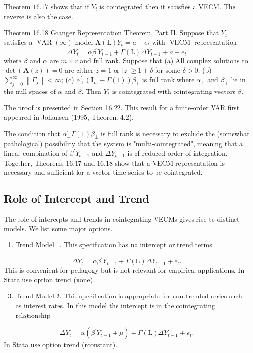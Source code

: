 \documentclass[10pt]{article}
\begin{document}
Theorem $16.17$ shows that if $Y_{t}$ is cointegrated then it satisfies a VECM. The reverse is also the case.

Theorem 16.18 Granger Representation Theorem, Part II. Suppose that $Y_{t}$ satisfies a $\operatorname{VAR}(\infty)$ model $\boldsymbol{A}(\mathrm{L}) Y_{t}=a+e_{t}$ with $\operatorname{VECM}$ representation
$$
\Delta Y_{t}=\alpha \beta^{\prime} Y_{t-1}+\Gamma(\mathrm{L}) \Delta Y_{t-1}+a+e_{t}
$$
where $\beta$ and $\alpha$ are $m \times r$ and full rank. Suppose that (a) All complex solutions to $\operatorname{det}(\boldsymbol{A}(z))=0$ are either $z=1$ or $|z| \geq 1+\delta$ for some $\delta>0$; (b) $\sum_{j=0}^{\infty}\left\|\Gamma_{j}\right\|<\infty$; (c) $\alpha_{\perp}^{\prime}\left(\boldsymbol{I}_{m}-\Gamma(1)\right) \beta_{\perp}$ is full rank where $\alpha_{\perp}$ and $\beta_{\perp}$ lie in the null spaces of $\alpha$ and $\beta$. Then $Y_{t}$ is cointegrated with cointegrating vectors $\beta$.

The proof is presented in Section 16.22. This result for a finite-order VAR first appeared in Johansen (1995, Theorem 4.2).

The condition that $\alpha_{\perp}^{\prime} \Gamma(1) \beta_{\perp}$ is full rank is necessary to exclude the (somewhat pathological) possibility that the system is "multi-cointegrated", meaning that a linear combination of $\beta^{\prime} Y_{t-1}$ and $\Delta Y_{t-1}$ is of reduced order of integration. Together, Theorems $16.17$ and $16.18$ show that a VECM representation is necessary and sufficient for a vector time series to be cointegrated.

\subsection{Role of Intercept and Trend}
The role of intercepts and trends in cointegrating VECMs gives rise to distinct models. We list some major options.

\begin{enumerate}
  \item Trend Model 1. This specification has no intercept or trend terms
\end{enumerate}
$$
\Delta Y_{t}=\alpha \beta^{\prime} Y_{t-1}+\Gamma(\mathrm{L}) \Delta Y_{t-1}+e_{t} .
$$
This is convenient for pedagogy but is not relevant for empirical applications. In Stata use option trend (none).

\begin{enumerate}
  \setcounter{enumi}{2}
  \item Trend Model 2. This specification is appropriate for non-trended series such as interest rates. In this model the intercept is in the cointegrating relationship
\end{enumerate}
$$
\Delta Y_{t}=\alpha\left(\beta^{\prime} Y_{t-1}+\mu\right)+\Gamma(\mathrm{L}) \Delta Y_{t-1}+e_{t} .
$$
In Stata use option trend (rconstant).
\end{document}
